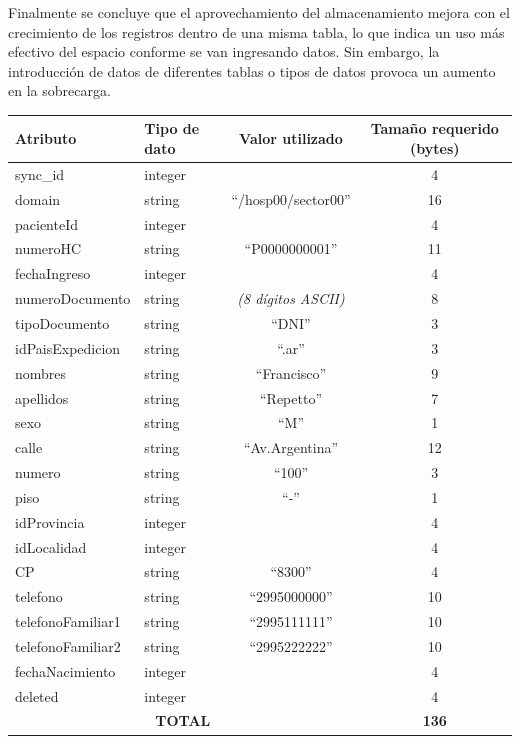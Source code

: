 Finalmente se concluye que el aprovechamiento del almacenamiento mejora con el crecimiento de los registros dentro de una misma tabla, lo que indica un uso más efectivo del espacio conforme se van ingresando datos. Sin embargo, la introducción de datos de diferentes tablas o tipos de datos provoca un aumento en la sobrecarga.
\begin{table}[]

\centering
{}
\label{tabla:TamReqSegTipoDat}
\begin{tabular}{|l|l|c|c|}
\hline
\textbf{Atributo} & \textbf{Tipo de dato} & \textbf{Valor utilizado} & \textbf{Tamaño requerido (bytes)} \\ \hline
sync\_id & integer & & 4 \\ \hline
domain & string & ``/hosp00/sector00'' & 16 \\ \hline
pacienteId & integer & & 4 \\ \hline
numeroHC & string & ``P0000000001'' & 11 \\ \hline
fechaIngreso & integer & & 4 \\ \hline
numeroDocumento & string & \textit{(8 dígitos ASCII)} & 8 \\ \hline
tipoDocumento & string & ``DNI'' & 3 \\ \hline
idPaisExpedicion & string & ``.ar'' & 3 \\ \hline
nombres & string & ``Francisco'' & 9 \\ \hline
apellidos & string & ``Repetto'' & 7 \\ \hline
sexo & string & ``M'' & 1 \\ \hline
calle & string & ``Av.Argentina'' & 12 \\ \hline
numero & string & ``100'' & 3 \\ \hline
piso & string & ``-'' & 1 \\ \hline
idProvincia & integer & & 4 \\ \hline
idLocalidad & integer & & 4 \\ \hline
CP & string & ``8300'' & 4 \\ \hline
telefono & string & ``2995000000'' & 10 \\ \hline
telefonoFamiliar1 & string & ``2995111111'' & 10 \\ \hline
telefonoFamiliar2 & string & ``2995222222'' & 10 \\ \hline
fechaNacimiento & integer & & 4 \\ \hline
deleted & integer & & 4 \\ \hline
\multicolumn{3}{|c|}{\textbf{TOTAL}} & \textbf{136} \\ \hline
\end{tabular}

\end{table}



